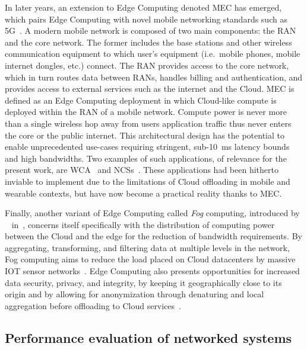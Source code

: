 %
%
In later years, an extension to Edge Computing denoted \gls{MEC} has emerged, which pairs Edge Computing with novel mobile networking standards such as 5G~\cite{hassan2019edge,pham2020survey,wan2020efficient}.
A modern mobile network is composed of two main components: the \gls{RAN} and the core network.
The former includes the base stations and other wireless communication equipment to which user's equipment (i.e.\ mobile phones, mobile internet dongles, etc.) connect. 
The \gls{RAN} provides access to the core network, which in turn routes data between \glspl{RAN}, handles billing and authentication, and provides access to external services such as the internet and the Cloud.
\gls{MEC} is defined as an Edge Computing deployment in which Cloud-like compute is deployed within the \gls{RAN} of a mobile network.
Compute power is never more than a single wireless hop away from users application traffic thus never enters the core or the public internet.
This architectural design has the potential to enable unprecedented use-cases requiring stringent, sub-\SI{10}{\milli\second} latency bounds and high bandwidths.
Two examples of such applications, of relevance for the present work, are \acl{WCA}~\cite{ha2014towards,chen2018application,wang2020scaling,chen2017empirical,chen2018application} and \aclp{NCS}~\cite{sasaki2016vehicle,wang2018bandwidth,wan2020efficient}.
These applications had been hitherto inviable to implement due to the limitations of Cloud offloading in mobile and wearable contexts, but have now become a practical reality thanks to \gls{MEC}.

Finally, another variant of Edge Computing called \emph{Fog} computing, introduced by \citeauthor{bonomi2012fog}~\cite{bonomi2012fog} in\ \citeyear{bonomi2012fog}, concerns itself specifically with the distribution of computing power between the Cloud and the edge for the reduction of bandwidth requirements.
By aggregating, transforming, and filtering data at multiple levels in the network, Fog computing aims to reduce the load placed on Cloud datacenters by massive \gls{IOT} sensor networks~\cite{yi2015survey}.
Edge Computing also presents opportunities for increased data security, privacy, and integrity, by keeping it geographically close to its origin and by allowing for anonymization through denaturing and local aggregation before offloading to Cloud services~\cite{satyanarayanan2017emergence}.

\subsection{Performance evaluation of networked systems}

